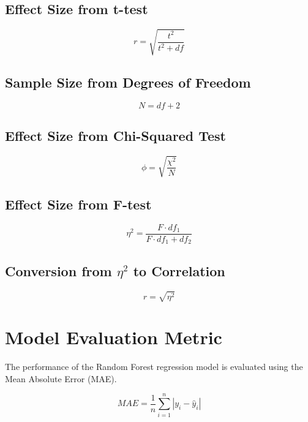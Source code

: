 \subsection{Effect Size from t-test}

\begin{equation}
	r = \sqrt{\frac{t^2}{t^2 + df}}
\end{equation}

\subsection{Sample Size from Degrees of Freedom}

\begin{equation}
	N = df + 2
\end{equation}

\subsection{Effect Size from Chi-Squared Test}

\begin{equation}
	\phi = \sqrt{\frac{\chi^2}{N}}
\end{equation}

\subsection{Effect Size from F-test}

\begin{equation}
	\eta^2 = \frac{F \cdot df_1}{F \cdot df_1 + df_2}
\end{equation}

\subsection{Conversion from $\eta^2$ to Correlation}

\begin{equation}
	r = \sqrt{\eta^2}
\end{equation}

\section{Model Evaluation Metric}

The performance of the Random Forest regression model is evaluated
using the Mean Absolute Error (MAE).

\begin{equation}
	MAE =
	\frac{1}{n}
	\sum_{i=1}^{n}
	|y_i - \hat{y}_i|
\end{equation}

